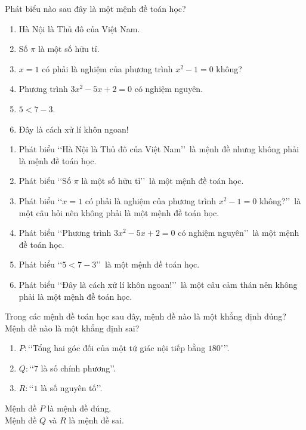 \begin{vd}%
	Phát biểu nào sau đây là một mệnh đề toán học?
	\begin{enumerate}
		\item Hà Nội là Thủ đô của Việt Nam.
		\item Số $\pi$ là một số hữu tỉ.
		\item $x=1$ có phải là nghiệm của phương trình $x^2-1=0$ không?
		\item Phương trình $3x^2-5x+2=0$ có nghiệm nguyên.
		\item $5<7-3$.
		\item Đây là cách xử lí khôn ngoan!
	\end{enumerate}
	\loigiai
	{
		\begin{enumerate}
			\item Phát biểu \lq\lq  Hà Nội là Thủ đô của Việt Nam\rq\rq\ là mệnh đề nhưng không phải là mệnh đề toán học.
			\item Phát biểu \lq\lq  Số $\pi$ là một số hữu tỉ\rq\rq\ là một mệnh đề toán học.
			\item Phát biểu \lq\lq  $x=1$ có phải là nghiệm của phương trình $x^2-1=0$ không?\rq\rq\ là một câu hỏi nên không phải là một mệnh đề toán học.
			\item Phát biểu \lq\lq  Phương trình $3x^2-5x+2=0$ có nghiệm nguyên\rq\rq\ là một mệnh đề toán học.
			\item Phát biểu \lq\lq  $5<7-3$\rq\rq\ là một mệnh đề toán học.
			\item Phát biểu \lq\lq  Đây là cách xử lí khôn ngoan!\rq\rq\ là một câu cảm thán nên không phải là một mệnh đề toán học.
		\end{enumerate}
	}
\end{vd}

\begin{vd}%
	Trong các mệnh đề toán học sau đây, mệnh đề nào là một khẳng định đúng? Mệnh đề nào là một khẳng định sai?
	\begin{enumerate}
		\item $P\colon$\lq\lq  Tổng hai góc đối của một tứ giác nội tiếp bằng $180^{\circ}$\rq\rq.
		\item $Q\colon$\lq\lq  $7$ là số chính phương\rq\rq.
		\item $R\colon$\lq\lq  $1$ là số nguyên tố\rq\rq.
	\end{enumerate}
	\loigiai
	{
		Mệnh đề $P$ là mệnh đề đúng. \\
		Mệnh đề $Q$ và $R$ là mệnh đề sai. \\
	}
\end{vd}

